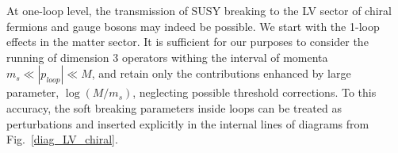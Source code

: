 \documentclass[12pt]{revtex4}
\begin{document}
At one-loop level, the transmission 
of SUSY breaking to the LV sector of chiral fermions and gauge bosons may indeed
be possible. We start with the 1-loop effects in the matter sector.
It is sufficient for our purposes to consider the running of dimension 3 operators 
withing the interval of momenta $ m_{s} \ll |p_{loop}|\ll M $, and retain only 
the contributions enhanced by large parameter, $\log(M/m_{s})$,
neglecting possible threshold corrections.
To this accuracy, 
	the soft breaking parameters inside loops can be treated as perturbations
	and inserted explicitly in the internal lines of diagrams from Fig.~\ref{diag_LV_chiral}.
\end{document}
